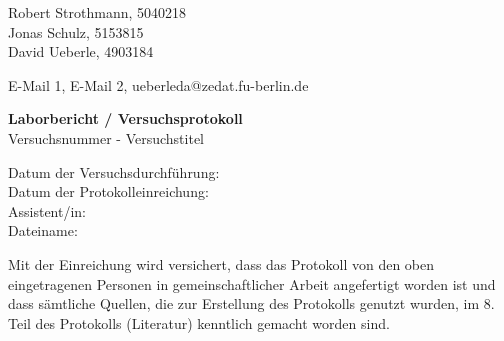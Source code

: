 %


%
\thispagestyle{empty}

\begin{flushleft}
Robert Strothmann, 5040218\\ 
Jonas Schulz, 5153815\\ 
David Ueberle, 4903184\\ 
\end{flushleft}
\vspace*{0.3cm}
E-Mail 1, E-Mail 2, ueberleda@zedat.fu-berlin.de\\
\begin{center}
	\vspace*{1cm}
	\Large
	{ \bfseries Laborbericht / Versuchsprotokoll}\\
	\vspace*{1cm}
	{Versuchsnummer - Versuchstitel}\\
\end{center}
	\vspace*{1cm}
	{Datum der Versuchsdurchführung:}\\
	{Datum der Protokolleinreichung:}\\
	{Assistent/in:}\\
	{Dateiname:}	
	\vfill
\begin{flushleft}
Mit der Einreichung wird versichert, dass das Protokoll von den oben eingetragenen Personen in gemeinschaftlicher Arbeit angefertigt worden ist und dass sämtliche Quellen, die zur Erstellung des Protokolls genutzt wurden, im 8. Teil des Protokolls (Literatur) kenntlich gemacht worden sind.
\end{flushleft}

\normalsize
\newpage
%